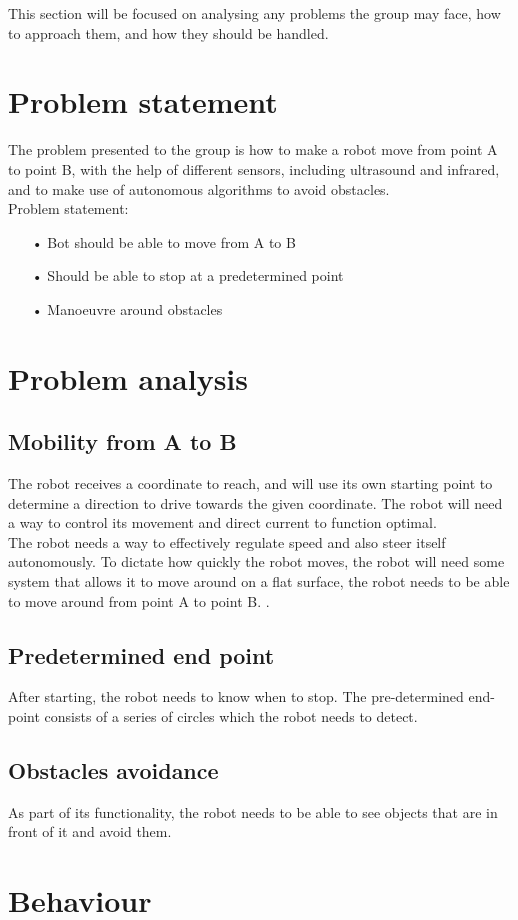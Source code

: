 This section will be focused on analysing any problems the group may face, how to approach them, and how they should be handled.

\section{Problem statement}

The problem presented to the group is how to make a robot move from point A to point B, with the help of different sensors, including ultrasound and infrared, and to make use of autonomous algorithms to avoid obstacles. \\

Problem statement:
\begin{enumerate}
\item[•]Bot should be able to move from A to B
\item[•]Should be able to stop at a predetermined point
\item[•]Manoeuvre around obstacles
\end{enumerate}

\section{Problem analysis}
\subsection{Mobility from A to B}
The robot receives a coordinate to reach, and will use its own starting point to determine a direction to drive towards the given coordinate. The robot will need a way to control its movement and direct current to function optimal.\\
The robot needs a way to effectively regulate speed and also steer itself autonomously. To dictate how quickly the robot moves, the robot will need some system that allows it to move around on a flat surface, the robot needs to be able to move around from point A to point B.
.\

\subsection{Predetermined end point}
After starting, the robot needs to know when to stop. The pre-determined end-point consists of a series of circles which the robot needs to detect. 

\subsection{Obstacles avoidance}
As part of its functionality, the robot needs to be able to see objects that are in front of it and avoid them. 

\section{Behaviour}
